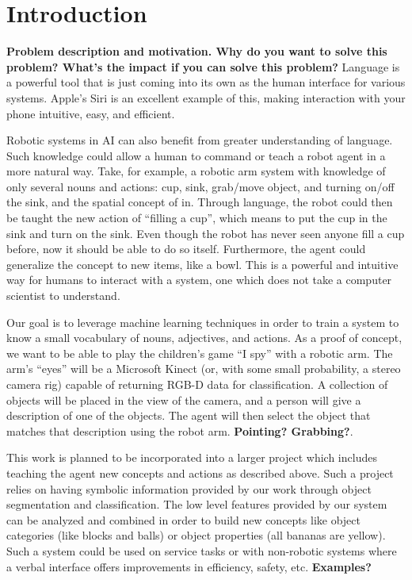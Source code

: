 \documentclass[11pt]{article}
\title{\xxx{Linguistic Classification of Objects}}
\author{Rob Goeddel \and Lauren Hinkle \and James Kirk \and Aaron Mininger}
\date{}
\newcommand{\xxx}[1]{{\bf \color{red} #1}}
\newcommand{\meh}[1]{{\bf \color{blue} #1}}
\begin{document}
\maketitle

\begin{abstract}
\xxx{Abstract goes here, 1 par. max}
Dijkstra was a cool guy and it's fun to cite his papers~\cite{dijkstra1959}. (It's true)
\end{abstract}

\section{Introduction}
\xxx{Problem description and motivation. Why do you want to solve this
    problem? What's the impact if you can solve this problem?}
Language is a powerful tool that is just coming into its own as the human
interface for various systems. Apple's Siri is an excellent example of this,
making interaction with your phone intuitive, easy, and efficient. 

Robotic systems in AI can also benefit from greater understanding of
language. Such knowledge could allow a human to command or teach a robot agent in a more natural way. Take, for example, a robotic arm system with knowledge of only
several nouns and actions: cup, sink, grab/move object, and turning on/off
the sink, and the spatial concept of in. Through language, the robot could then be taught the new action of ``filling a cup'', which means to put the cup in the sink and turn on the
sink. Even though the robot has never seen anyone fill a cup before, now
it should be able to do so itself. Furthermore, the agent could generalize the concept to new items, like a bowl. This is a powerful
and intuitive way for humans to interact with a system, one which does not
take a computer scientist to understand.

Our goal is to leverage machine learning techniques in order to train a system to know a small vocabulary of nouns, adjectives,
and actions. As a proof of concept, we want to be able to play the children's
game ``I spy'' with a robotic arm. The arm's ``eyes'' will be a Microsoft
Kinect (or, with some small probability, a stereo camera rig) capable of
returning RGB-D data for classification. A collection of objects will be placed in the view of the camera, and a person will give a description of one of the objects. The agent will then select the object that matches that description using the robot arm. \meh{Pointing? Grabbing?}.

This work is planned to be incorporated into a larger project which includes teaching the agent new concepts and actions as described above. Such a project relies on having symbolic information provided by our work through object segmentation and classification. The low level features provided by our system can be analyzed and combined in order to build new concepts like object categories (like blocks and balls) or object properties (all bananas are yellow). Such a system could be used on service tasks or with non-robotic systems where a verbal interface
offers improvements in efficiency, safety, etc. \xxx{Examples?}
\end{document}
